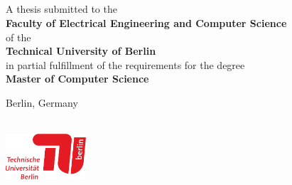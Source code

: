 \thispagestyle{empty}
\rule{0cm}{2cm}

\fontsize{19.83}{26.45} \selectfont 
\noindent \textbf{\titleLineOne} \vspace{0.2cm}
\\\textbf{\titleLineTwo}\vspace{0.2cm}
\\\textbf{\titleLineThree}
\normalsize

\newpage
\thispagestyle{empty}
\rule{0cm}{2cm}
\newpage

\thispagestyle{empty}
\rule{0cm}{1.5cm}

\fontsize{26.44}{32} \selectfont 
\noindent \textbf{\titleLineOne} \vspace{0.2cm}
\\\textbf{\titleLineTwo}\vspace{0.2cm}
\\\textbf{\titleLineThree}
\normalsize



\vspace{1.5cm}
 
\noindent \textbf{\studentname}

\vspace{-0.25cm}
\vspace{7cm}

\noindent A thesis submitted to the 
\\\textbf{Faculty of Electrical Engineering and Computer Science
} 
\\of the 
\\\textbf{Technical University of Berlin} 
\\in partial fulfillment of the requirements for the degree 
\\\textbf{Master of Computer Science}

\vspace{-0.5cm}
 
\noindent Berlin, Germany\\ 
\documentdate\\

\vspace{-0.83cm}

\noindent \includegraphics[width=30mm,angle=0]{graphics/tu_logo}

